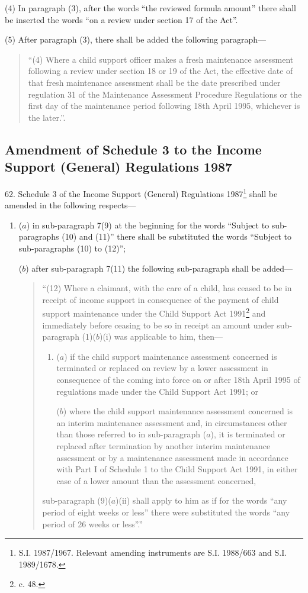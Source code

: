 \documentclass[12pt,a4paper]{article}
\begin{document}
(4) In paragraph (3), after the words “the reviewed formula amount” there shall be inserted the words “on a review under section 17 of the Act”.

(5) After paragraph (3), there shall be added the following paragraph—
\begin{quotation}
“(4) Where a child support officer makes a fresh maintenance assessment following a review under section 18 or 19 of the Act, the effective date of that fresh maintenance assessment shall be the date prescribed under regulation 31 of the Maintenance Assessment Procedure Regulations or the first day of the maintenance period following 18th April 1995, whichever is the later.”.
\end{quotation}

\subsection[62. Amendment of Schedule 3 to the Income Support (General) Regulations 1987]{\sloppy Amendment of Schedule 3 to the Income Support (General) Regulations 1987}

62.  Schedule 3 of the Income Support (General) Regulations 1987\footnote{\frenchspacing S.I. 1987/1967. Relevant amending instruments are S.I. 1988/663 and S.I. 1989/1678.} shall be amended in the following respects—
\begin{enumerate}\item[]
($a$) in sub-paragraph 7(9) at the beginning for the words “Subject to sub-paragraphs (10) and (11)” there shall be substituted the words “Subject to sub-paragraphs (10) to (12)”;

($b$) after sub-paragraph 7(11) the following sub-paragraph shall be added—
\begin{quotation}
“(12) Where a claimant, with the care of a child, has ceased to be in receipt of income support in consequence of the payment of child support maintenance under the Child Support Act 1991\footnote{ c. 48.} and immediately before ceasing to be so in receipt an amount under sub-paragraph (1)($b$)(i) was applicable to him, then—
\begin{enumerate}\item[]
($a$) if the child support maintenance assessment concerned is terminated or replaced on review by a lower assessment in consequence of the coming into force on or after 18th April 1995 of regulations made under the Child Support Act 1991; or

($b$) where the child support maintenance assessment concerned is an interim maintenance assessment and, in circumstances other than those referred to in sub-paragraph ($a$), it is terminated or replaced after termination by another interim maintenance assessment or by a maintenance assessment made in accordance with Part I of Schedule 1 to the Child Support Act 1991, in either case of a lower amount than the assessment concerned,
\end{enumerate}
sub-paragraph (9)($a$)(ii) shall apply to him as if for the words “any period of eight weeks or less” there were substituted the words “any period of 26 weeks or less”.”
\end{quotation}
\end{enumerate}
\end{document}
